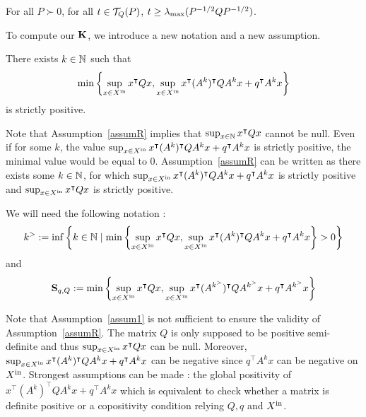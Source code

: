 \documentclass[10pt]{llncs}
\begin{document}
\begin{prop}
\label{propcont}
For all $P\succ 0$, for all $t\in\mathcal{T}_{Q}(P)$, $t\geq \lambda_{\operatorname{max}}(P^{-1/2} Q P^{-1/2})$.
\end{prop}
%
To compute our $\mathbf{K}$, we introduce a new notation and a new assumption. 
 \begin{assumption}
\label{assumR}
There exists $k\in\mathbb{N}$ such that\[\min\left\{\sup_{x\in X^\mathrm{in}} x^\intercal Q x , \sup_{x\in X^\mathrm{in}} x^\intercal (A^k)^\intercal Q A^k x+q^\intercal A^k x\right\}\] is strictly positive.
\end{assumption}

Note that Assumption~\ref{assumR} implies that $\sup_{x\in\mathbb{N}} x^\intercal Q x$ cannot be null. Even if for some $k$, the value
$\sup_{x\in X^\mathrm{in}} x^\intercal (A^k)^\intercal Q A^k x+q^\intercal A^k x$ is strictly positive, the minimal value would be equal to 0. 
Assumption~\ref{assumR} can be written as there exists  some $k\in\mathbb{N}$, for which $\sup_{x\in X^\mathrm{in}} x^\intercal (A^k)^\intercal Q A^k x+q^\intercal A^k x$ is strictly positive and $\sup_{x\in X^\mathrm{in}} x^\intercal Q x$ is strictly positive.
 
We will need the following notation :
\[
k^{>}:=\inf\left\{k\in\mathbb{N}\mid \min\left\{\sup_{x\in X^\mathrm{in}} x^\intercal Q x , \sup_{x\in X^\mathrm{in}} x^\intercal (A^k)^\intercal Q A^k x+q^\intercal A^k x\right\}>0\right\}
\]
and
\[
\mathbf{S}_{q,Q}:= \min\left\{\sup_{x\in X^\mathrm{in}} x^\intercal Q x , \sup_{x\in X^\mathrm{in}} x^\intercal (A^{k^{>}})^\intercal Q A^{k^{>}} x+q^\intercal A^{k^{>}}x\right\}
\]

Note that Assumption~\ref{assum1} is not sufficient to ensure the validity of Assumption~\ref{assumR}. The matrix $Q$ is only supposed to be positive semi-definite and thus $\sup_{x\in X^\mathrm{in}} x^\intercal Q x$ can be null. Moreover, $\sup_{x\in X^\mathrm{in}} x^\intercal (A^k)^\intercal Q A^k x+q^\intercal A^k x$ can be negative since $q^\intercal A^k x$ can be negative on $X^\mathrm{in}$. Strongest assumptions can be made : the global positivity of $x^\intercal (A^k)^\intercal  Q A^k x+q^\intercal A^k x$ which is equivalent to check whether a matrix is definite positive or a copositivity condition relying $Q,q$ and $X^\mathrm{in}$. 
\end{document}
